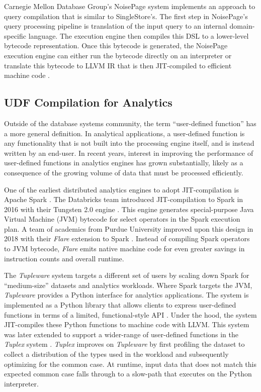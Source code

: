 \documentclass{vldb}
\begin{document}
Carnegie Mellon Database Group's NoisePage system implements an approach to query compilation that is similar to SingleStore's. The first step in NoisePage's query processing pipeline is translation of the input query to an internal domain-specific language. The execution engine then compiles this DSL to a lower-level bytecode representation. Once this bytecode is generated, the NoisePage execution engine can either run the bytecode directly on an interpreter or translate this bytecode to LLVM IR that is then JIT-compiled to efficient machine code \cite{pcq}.

\subsection{UDF Compilation for Analytics}

Outside of the database systems community, the term ``user-defined function'' has a more general definition. In analytical applications, a user-defined function is any functionality that is not built into the processing engine itself, and is instead written by an end-user. In recent years, interest in improving the performance of user-defined functions in analytics engines has grown substantially, likely as a consequence of the growing volume of data that must be processed efficiently.

One of the earliest distributed analytics engines to adopt JIT-compilation is Apache Spark \cite{spark}. The Databricks team introduced JIT-compilation to Spark in 2016 with their Tungsten 2.0 engine \cite{spark16}. This engine generates special-purpose Java Virtual Machine (JVM) bytecode for select operators in the Spark execution plan. A team of academics from Purdue University improved upon this design in 2018 with their \textit{Flare} extension to Spark \cite{flare}. Instead of compiling Spark operators to JVM bytecode, \textit{Flare} emits native machine code for even greater savings in instruction counts and overall runtime.

The \textit{Tupleware} system targets a different set of users by scaling down Spark for ``medium-size'' datasets and analytics workloads. Where Spark targets the JVM, \textit{Tupleware} provides a Python interface for analytics applications. The system is implemented as a Python library that allows clients to express user-defined functions in terms of a limited, functional-style API \cite{tupleware}. Under the hood, the system JIT-compiles these Python functions to machine code with LLVM. This system was later extended to support a wider-range of user-defined functions in the \textit{Tuplex} system \cite{tuplex}. \textit{Tuplex} improves on \textit{Tupleware} by first profiling the dataset to collect a distribution of the types used in the workload and subsequently optimizing for the common case. At runtime, input data that does not match this expected common case falls through to a slow-path that executes on the Python interpreter.
\end{document}
